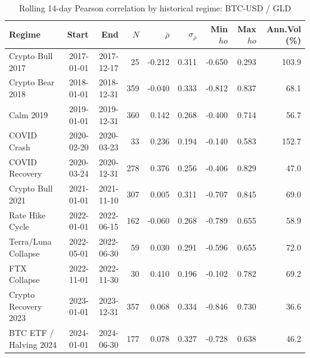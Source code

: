 \begin{table}[H]
\centering
\small
\caption{Rolling 14-day Pearson correlation by historical regime: BTC-USD / GLD}
\label{tab:regime_corr_BTCUSDGLD}
\begin{tabular}{lrrrrrrrr}
\toprule
Regime & Start & End & $N$ & $\bar{\rho}$ & $\sigma_\rho$ & Min $
ho$ & Max $
ho$ & Ann.Vol (\%) \\
\midrule
Crypto Bull 2017 & 2017-01-01 & 2017-12-17 & 25 & -0.212 & 0.311 & -0.650 & 0.293 & 103.9 \\
Crypto Bear 2018 & 2018-01-01 & 2018-12-31 & 359 & -0.040 & 0.333 & -0.812 & 0.837 & 68.1 \\
Calm 2019 & 2019-01-01 & 2019-12-31 & 360 & 0.142 & 0.268 & -0.400 & 0.714 & 56.7 \\
COVID Crash & 2020-02-20 & 2020-03-23 & 33 & 0.236 & 0.194 & -0.140 & 0.583 & 152.7 \\
COVID Recovery & 2020-03-24 & 2020-12-31 & 278 & 0.376 & 0.256 & -0.406 & 0.829 & 47.0 \\
Crypto Bull 2021 & 2021-01-01 & 2021-11-10 & 307 & 0.005 & 0.311 & -0.707 & 0.845 & 69.0 \\
Rate Hike Cycle & 2022-01-01 & 2022-06-15 & 162 & -0.060 & 0.268 & -0.789 & 0.655 & 58.9 \\
Terra/Luna Collapse & 2022-05-01 & 2022-06-30 & 59 & 0.030 & 0.291 & -0.596 & 0.655 & 72.0 \\
FTX Collapse & 2022-11-01 & 2022-11-30 & 30 & 0.410 & 0.196 & -0.102 & 0.782 & 69.2 \\
Crypto Recovery 2023 & 2023-01-01 & 2023-12-31 & 357 & 0.068 & 0.334 & -0.846 & 0.730 & 36.6 \\
BTC ETF / Halving 2024 & 2024-01-01 & 2024-06-30 & 177 & 0.078 & 0.327 & -0.728 & 0.638 & 46.2 \\
\bottomrule
\end{tabular}
\end{table}